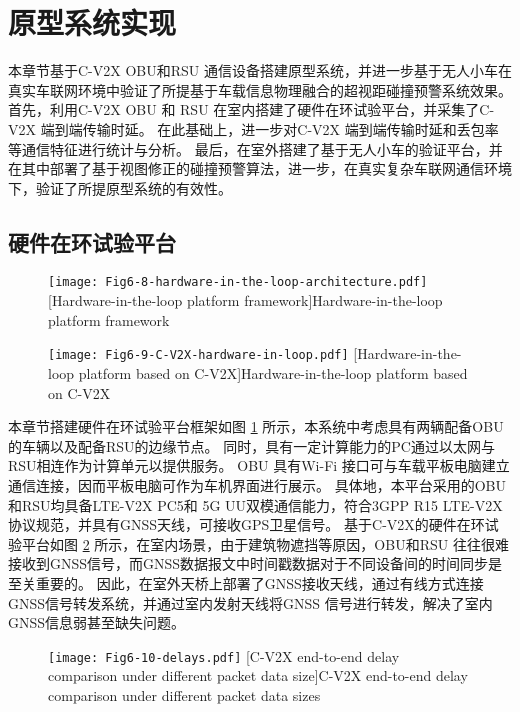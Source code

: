 \section{原型系统实现}\label{section 6-5}

本章节基于C-V2X OBU和RSU 通信设备搭建原型系统，并进一步基于无人小车在真实车联网环境中验证了所提基于车载信息物理融合的超视距碰撞预警系统效果。
首先，利用C-V2X OBU 和 RSU 在室内搭建了硬件在环试验平台，并采集了C-V2X 端到端传输时延。
在此基础上，进一步对C-V2X 端到端传输时延和丢包率等通信特征进行统计与分析。
最后，在室外搭建了基于无人小车的验证平台，并在其中部署了基于视图修正的碰撞预警算法，进一步，在真实复杂车联网通信环境下，验证了所提原型系统的有效性。

\subsection{硬件在环试验平台}

\begin{figure}[h]
\centering
  \texttt{[image: Fig6-8-hardware-in-the-loop-architecture.pdf]}
  [Hardware-in-the-loop platform framework]{Hardware-in-the-loop platform framework}
  \label{fig 6-8}
\end{figure}

\begin{figure}[h]
\centering
  \texttt{[image: Fig6-9-C-V2X-hardware-in-loop.pdf]}
  [Hardware-in-the-loop platform based on C-V2X]{Hardware-in-the-loop platform based on C-V2X}
  \label{fig 6-9}
\end{figure}

本章节搭建硬件在环试验平台框架如图 \ref{fig 6-8} 所示，本系统中考虑具有两辆配备OBU的车辆以及配备RSU的边缘节点。
同时，具有一定计算能力的PC通过以太网与RSU相连作为计算单元以提供服务。
OBU 具有Wi-Fi 接口可与车载平板电脑建立通信连接，因而平板电脑可作为车机界面进行展示。
具体地，本平台采用的OBU和RSU均具备LTE-V2X PC5和 5G UU双模通信能力，符合3GPP R15 LTE-V2X协议规范，并具有GNSS天线，可接收GPS卫星信号。
基于C-V2X的硬件在环试验平台如图 \ref{fig 6-9} 所示，在室内场景，由于建筑物遮挡等原因，OBU和RSU 往往很难接收到GNSS信号，而GNSS数据报文中时间戳数据对于不同设备间的时间同步是至关重要的。
因此，在室外天桥上部署了GNSS接收天线，通过有线方式连接GNSS信号转发系统，并通过室内发射天线将GNSS 信号进行转发，解决了室内GNSS信息弱甚至缺失问题。

\begin{figure}[h]
\centering
  \texttt{[image: Fig6-10-delays.pdf]}
  [C-V2X end-to-end delay comparison under different packet data size]{C-V2X end-to-end delay comparison under different packet data sizes}
  \label{fig 6-10}
\end{figure}

